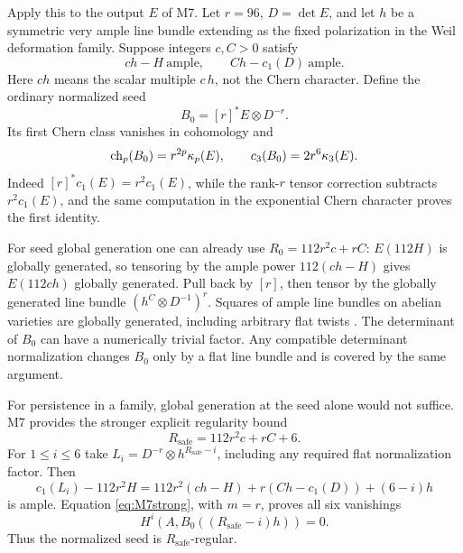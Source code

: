 Apply this to the output $E$ of M7. Let $r=96$, $D=\det E$, and let
$h$ be a symmetric very ample line bundle extending as the fixed
polarization in the Weil deformation family. Suppose integers $c,C>0$
satisfy
\begin{equation}\label{eq:M8comparisons}
 ch-H\ \text{ample},\qquad Ch-c_1(D)\ \text{ample}.
\end{equation}
Here $ch$ means the scalar multiple $c\,h$, not the Chern character.
Define the ordinary normalized seed
\[
 B_0=[r]^*E\otimes D^{-r}.
\]
Its first Chern class vanishes in cohomology and
\begin{equation}\label{eq:M8normalizedcharacter}
 \operatorname{ch}_p(B_0)=r^{2p}\kappa_p(E),\qquad
 c_3(B_0)=2r^6\kappa_3(E).
\end{equation}
Indeed $[r]^*c_1(E)=r^2c_1(E)$, while the rank-$r$ tensor correction
subtracts $r^2c_1(E)$, and the same computation in the exponential
Chern character proves the first identity.

For seed global generation one can already use
$R_0=112r^2c+rC$: $E(112H)$ is globally generated, so tensoring by
the ample power $112(ch-H)$ gives $E(112ch)$ globally generated.
Pull back by $[r]$, then tensor by the globally generated line bundle
$(h^C\otimes D^{-1})^r$.
Squares of ample line bundles on abelian varieties are globally
generated, including arbitrary flat twists
\citep[Theorem~1.1(a)]{BauerSzemberg96}.
The determinant of $B_0$ can have a numerically trivial factor.
Any compatible determinant normalization changes $B_0$ only by a
flat line bundle and is covered by the same argument.

For persistence in a family, global generation at the seed alone
would not suffice. M7 provides the stronger explicit regularity bound
\begin{equation}\label{eq:M8R}
 R_{\mathrm{safe}}=112r^2c+rC+6.
\end{equation}
For $1\le i\le6$ take
$L_i=D^{-r}\otimes h^{R_{\mathrm{safe}}-i}$, including any required
flat normalization factor. Then
\[
 c_1(L_i)-112r^2H
 =112r^2(ch-H)+r(Ch-c_1(D))+(6-i)h
\]
is ample. Equation \eqref{eq:M7strong}, with $m=r$, proves all six
vanishings
\[
 H^i(A,B_0((R_{\mathrm{safe}}-i)h))=0.
\]
Thus the normalized seed is $R_{\mathrm{safe}}$-regular.

